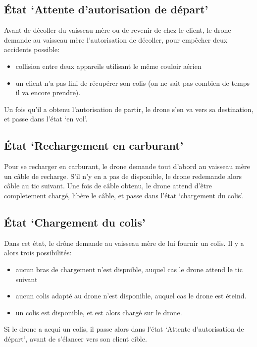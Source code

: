 \subsection{État `Attente d'autorisation de départ'}
    Avant de décoller du vaisseau mère ou de revenir de chez le client, le drone demande au vaisseau mère
    l'autorisation de décoller, pour empêcher deux accidents possible:
    \begin{itemize}
        \item collision entre deux appareils utilisant le même couloir aérien
        \item un client n'a pas fini de récupérer son colis (on ne sait pas combien de temps il va encore prendre).
    \end{itemize}
    Un fois qu'il a obtenu l'autorisation de partir, le drone s'en va vers sa destination, et passe dans l'état `en vol'.

\subsection{État `Rechargement en carburant'}
    Pour se recharger en carburant, le drone demande tout d'abord au vaisseau mère un câble de recharge.
    S'il n'y en a pas de disponible, le drone redemande alors câble au tic suivant.
    Une fois de câble obtenu, le drone attend d'être completement chargé, libère le câble,
    et passe dans l'état `chargement du colis'.

\subsection{État `Chargement du colis'}
    Dans cet état, le drône demande au vaisseau mère de lui fournir un colis.
    Il y a alors trois possibilités:
    \begin{itemize}
        \item aucun bras de chargement n'est dispnible, auquel cas le drone attend le tic suivant
        \item aucun colis adapté au drone n'est disponible, auquel cas le drone est éteind.
        \item un colis est disponible, et est alors chargé sur le drone.
    \end{itemize}
    Si le drone a acqui un colis, il passe alors dans l'état `Attente d'autorisation de départ',
    avant de s'élancer vers son client cible.

